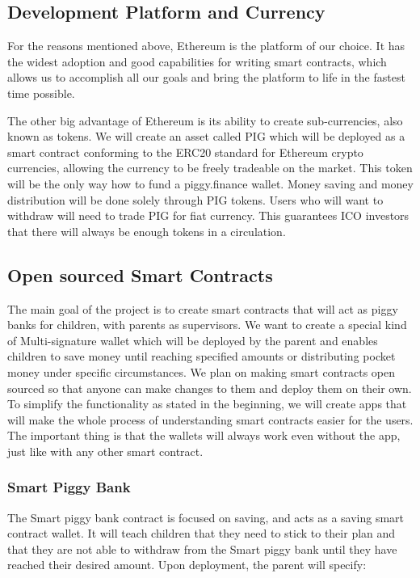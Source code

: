 \documentclass[english]{article}
\begin{document}
\subsection{Development Platform and Currency}
For the reasons mentioned above, Ethereum is the platform of our choice. It has the widest adoption and good capabilities for writing smart contracts, which allows us to accomplish all our goals and bring the platform to life in the fastest time possible. 

The other big advantage of Ethereum is its ability to create sub-currencies, also known as tokens. We will create an asset called PIG which will be deployed as a smart contract conforming to the ERC20 standard for Ethereum crypto currencies, allowing the currency to be freely tradeable on the market. This token will be the only way how to fund a piggy.finance wallet. Money saving and money distribution will be done solely through  PIG tokens. Users who will want to withdraw will need to trade PIG for fiat currency. This guarantees ICO investors that there will always be enough tokens in a circulation.

\subsection{Open sourced Smart Contracts}
The main goal of the project is to create smart contracts that will act as piggy banks for children, with parents as supervisors. We want to create a special kind of Multi-signature wallet which will be deployed by the parent and enables children to save money until reaching specified amounts or distributing pocket money under specific circumstances. We plan on making smart contracts open sourced so that anyone can make changes to them and deploy them on their own. To simplify the functionality as stated in the beginning, we will create apps that will make the whole process of understanding smart contracts easier  for the users. The important thing is that the wallets will always work even without the app, just like with any other smart contract. 

\subsubsection{Smart Piggy Bank}
The Smart piggy bank contract is focused on saving, and acts as a saving smart contract wallet. It will teach children that they need to stick to their plan and that they are not able to withdraw from the Smart piggy bank until they have reached their desired amount. Upon deployment, the parent will specify:
\end{document}
